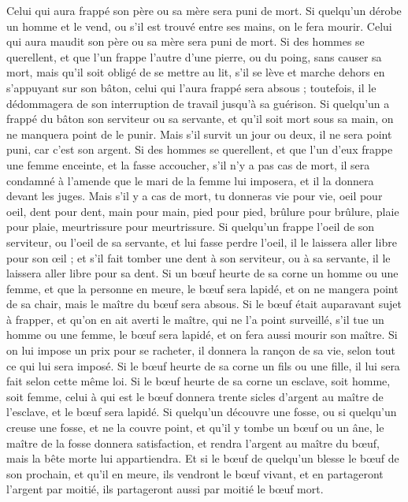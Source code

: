 \begin{multicols}{2}
Celui qui aura frappé son père ou sa mère sera puni de mort\FTNT{}.
Si quelqu'un dérobe un homme et le vend, ou s'il est trouvé entre ses mains, on le fera mourir.
Celui qui aura maudit son père ou sa mère sera puni de mort.
Si des hommes se querellent, et que l'un frappe l'autre d'une pierre, ou du poing, sans causer sa mort, mais qu'il soit obligé de se mettre au lit,
s'il se lève et marche dehors en s'appuyant sur son bâton, celui qui l'aura frappé sera absous ; toutefois, il le dédommagera de son interruption de travail jusqu’à sa guérison.
Si quelqu'un a frappé du bâton son serviteur ou sa servante, et qu'il soit mort sous sa main, on ne manquera point de le punir.
Mais s'il survit un jour ou deux, il ne sera point puni, car c'est son argent.
Si des hommes se querellent, et que l'un d'eux frappe une femme enceinte, et la fasse accoucher, s'il n'y a pas cas de mort, il sera condamné à l'amende que le mari de la femme lui imposera, et il la donnera devant les juges.
Mais s'il y a cas de mort, tu donneras vie pour vie,
oeil pour oeil, dent pour dent, main pour main, pied pour pied\FTNT{},
brûlure pour brûlure, plaie pour plaie, meurtrissure pour meurtrissure.
Si quelqu'un frappe l'oeil de son serviteur, ou l'oeil de sa servante, et lui fasse perdre l'oeil, il le laissera aller libre pour son œil ;
et s'il fait tomber une dent à son serviteur, ou à sa servante, il le laissera aller libre pour sa dent.
Si un bœuf heurte de sa corne un homme ou une femme, et que la personne en meure, le bœuf sera lapidé, et on ne mangera point de sa chair, mais le maître du bœuf sera absous.
Si le bœuf était auparavant sujet à frapper, et qu’on en ait averti le maître, qui ne l'a point surveillé, s'il tue un homme ou une femme, le bœuf sera lapidé, et on fera aussi mourir son maître.
Si on lui impose un prix pour se racheter, il donnera la rançon de sa vie, selon tout ce qui lui sera imposé.
Si le bœuf heurte de sa corne un fils ou une fille, il lui sera fait selon cette même loi.
Si le bœuf heurte de sa corne un esclave, soit homme, soit femme, celui à qui est le bœuf donnera trente sicles d'argent au maître de l'esclave, et le bœuf sera lapidé.
Si quelqu'un découvre une fosse, ou si quelqu'un creuse une fosse, et ne la couvre point, et qu'il y tombe un bœuf ou un âne,
le maître de la fosse donnera satisfaction, et rendra l'argent au maître du bœuf, mais la bête morte lui appartiendra.
Et si le bœuf de quelqu'un blesse le bœuf de son prochain, et qu'il en meure, ils vendront le bœuf vivant, et en partageront l'argent par moitié, ils partageront aussi par moitié le bœuf mort.

\end{multicols}
